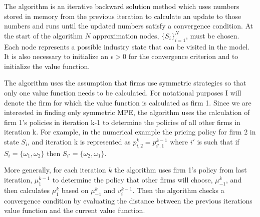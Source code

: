 \documentclass[12pt]{article}
\begin{document}

The \citet{1992_Pakes_McGuire_NBER} algorithm is an iterative backward solution method which uses numbers stored in memory from the previous iteration to calculate an update to those numbers and runs until the updated numbers satisfy a convergence condition. At the start of the algorithm $N$ approximation nodes, $\{S_i\}_{i=1}^N$, must be chosen. Each node represents a possible industry state that can be visited in the model. It is also necessary to initialize an $\epsilon>0$ for the convergence criterion and to initialize the value function.

The algorithm uses the assumption that firms use symmetric strategies so that only one value function needs to be calculated. For notational purposes I will denote the firm for which the value function is calculated as firm 1. Since we are interested in finding only symmetric MPE, the \citet{1992_Pakes_McGuire_NBER} algorithm uses the calculation of firm 1's policies in iteration k-1 to determine the policies of all other firms in iteration k. For example, in the numerical example the pricing policy for firm 2 in state $S_i$, and iteration k is represented as $p^{k}_{i,2}=p^{k-1}_{i',1}$ where $i'$ is such that if $S_i=\{\omega_1,\omega_2\}$ then $S_{i'}=\{\omega_2,\omega_1\}$.

More generally, for each iteration $k$ the algorithm uses firm 1's policy from last iteration, $\mu^{k-1}_1$ to determine the policy that other firms will choose, $\mu^k_{-1}$, and then calculates $\mu^k_1$ based on $\mu^k_{-1}$ and $v_i^{k-1}$. Then the algorithm checks a convergence condition by evaluating the distance between the previous iterations value function and the current value function.
\end{document}
